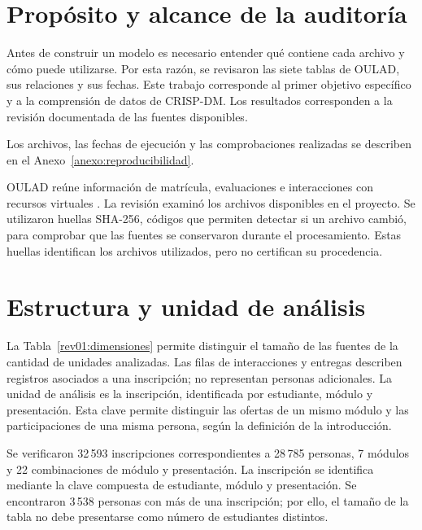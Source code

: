 \label{cap:caracterizacion}
\section{Propósito y alcance de la auditoría}
Antes de construir un modelo es necesario entender qué contiene cada archivo y cómo puede utilizarse. Por esta razón, se revisaron las siete tablas de OULAD, sus relaciones y sus fechas. Este trabajo corresponde al primer objetivo específico y a la comprensión de datos de CRISP-DM. Los resultados corresponden a la revisión documentada de las fuentes disponibles.

Los archivos, las fechas de ejecución y las comprobaciones realizadas se describen en el Anexo~\ref{anexo:reproducibilidad}.

OULAD reúne información de matrícula, evaluaciones e interacciones con recursos virtuales \cite{sdata2017171}. La revisión examinó los archivos disponibles en el proyecto. Se utilizaron huellas SHA-256, códigos que permiten detectar si un archivo cambió, para comprobar que las fuentes se conservaron durante el procesamiento. Estas huellas identifican los archivos utilizados, pero no certifican su procedencia.

\section{Estructura y unidad de análisis}
La Tabla~\ref{rev01:dimensiones} permite distinguir el tamaño de las fuentes de la cantidad de unidades analizadas. Las filas de interacciones y entregas describen registros asociados a una inscripción; no representan personas adicionales.
La unidad de análisis es la inscripción, identificada por estudiante, módulo y presentación. Esta clave permite distinguir las ofertas de un mismo módulo y las participaciones de una misma persona, según la definición de la introducción.

Se verificaron 32\,593 inscripciones correspondientes a 28\,785 personas, 7 módulos y 22 combinaciones de módulo y presentación. La inscripción se identifica mediante la clave compuesta de estudiante, módulo y presentación. Se encontraron 3\,538 personas con más de una inscripción; por ello, el tamaño de la tabla no debe presentarse como número de estudiantes distintos.

